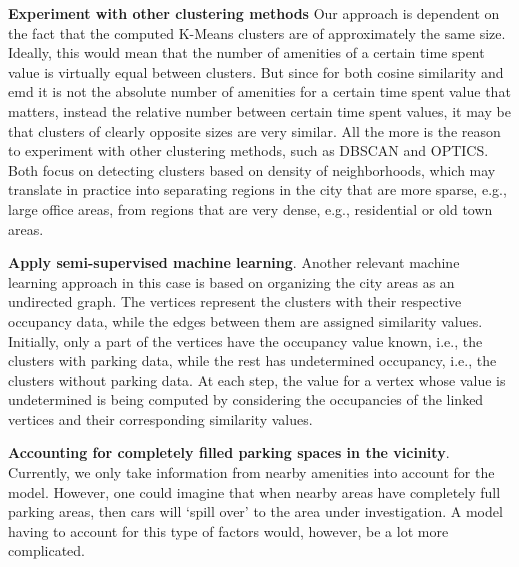 \begin{romanlist}
		\item \textbf{Experiment with other clustering methods}
		Our approach is dependent on the fact that the computed K-Means clusters are of approximately the same size. Ideally, this would mean that the number of amenities of a certain time spent value is virtually equal between clusters. But since for both cosine similarity and emd it is not the absolute number of amenities for a certain time spent value that matters, instead the relative number between certain time spent values, it may be that clusters of clearly opposite sizes are very similar. All the more is the reason to experiment with other clustering methods, such as DBSCAN and OPTICS. Both focus on detecting clusters based on density of neighborhoods, which may translate in practice into separating regions in the city that are more sparse, e.g., large office areas, from regions that are very dense, e.g., residential or old town areas.
		
		\item \textbf{Apply semi-supervised machine learning}.
		Another relevant machine learning approach in this case is based on organizing the city areas as an undirected graph.
		The vertices represent the clusters with their respective occupancy data, while the edges between them are assigned similarity values.
		Initially, only a part of the vertices have the occupancy value known, i.e., the clusters with parking data, while the rest has undetermined occupancy, i.e., the clusters without parking data.
		At each step, the value for a vertex whose value is undetermined is being computed by considering the occupancies of the linked vertices and their corresponding similarity values.
		
		\item \textbf{Accounting for completely filled parking spaces in the vicinity}.
		Currently, we only take information from nearby amenities into account for the model.
		However, one could imagine that when nearby areas have completely full parking areas, then cars will `spill over' to the area under investigation.
		A model having to account for this type of factors would, however, be a lot more complicated.
	\end{romanlist} 
	
	
